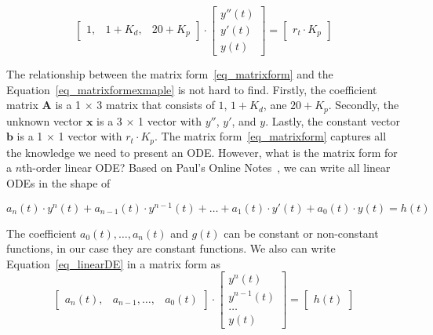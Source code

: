 \begin{equation} \label{eq_matrixformexmaple}
	\begin{bmatrix}
		1, & 1 + K_{d}, & 20 + K_{p}
	\end{bmatrix}
	\cdot
	\begin{bmatrix}
		y''(t)  \\
		y'(t)   \\
		y(t)  
	\end{bmatrix}
	=
	\begin{bmatrix}
		r_{t} \cdot K_{p} 
	\end{bmatrix}
\end{equation}

The relationship between the matrix form~\ref{eq_matrixform} and the Equation~\ref{eq_matrixformexmaple} is not hard to find. Firstly, the coefficient matrix $\boldsymbol{A}$ is a 1 $\times$ 3 matrix that consists of $1$, $1 + K_d$, ane $20 + K_p$. Secondly, the unknown vector $\boldsymbol{x}$ is a 3 $\times$ 1 vector with $y''$, $y'$, and $y$. Lastly, the constant vector $\boldsymbol{b}$ is a 1 $\times$ 1 vector with $r_t \cdot K_p$. The matrix form~\ref{eq_matrixform} captures all the knowledge we need to present an ODE. However, what is the matrix form for a $n$th-order linear ODE? Based on Paul's Online Notes~\citep{paullinearode}, we can write all linear ODEs in the shape of

\begin{equation} \label{eq_linearDE}
	a_n(t) \cdot y^n(t) + a_{n-1}(t) \cdot y^{n-1}(t) + \dots + a_1(t) \cdot y'(t) + a_0(t) \cdot y(t) = h(t)
\end{equation}

The coefficient $a_0(t), \dots, a_n(t)$ and $g(t)$ can be constant or non-constant functions, in our case they are constant functions. We also can write Equation~\ref{eq_linearDE} in a matrix form as
\begin{equation} \label{eq_matrixnthorder}
	\begin{bmatrix}
		a_n(t), & a_{n-1}, \dots, & a_0(t)
	\end{bmatrix}
	\cdot
	\begin{bmatrix}
		y^{n}(t) \\
		y^{n-1}(t) \\
		\dots \\
		y(t)  
	\end{bmatrix}
	=
	\begin{bmatrix}
		h(t)
	\end{bmatrix}
\end{equation}

